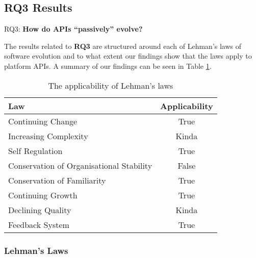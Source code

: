 \documentclass{sig-alternate}
\begin{document}
\subsection{RQ3 Results} \label{results_RQ3} 
\noindent
RQ3: \textbf{How do APIs ``passively'' evolve?}
\smallskip

The results related to \textbf{RQ3} are structured around each of Lehman's laws of software evolution \cite{lehman90sview} and to what extent our findings show that the laws apply to platform APIs. A summary of our findings can be seen in Table \ref{table:lehman}. 


\begin{table}
       \centering
       \begin{tabular}[ht]{l|c}
              \toprule

              \textbf{Law}                              & \textbf{Applicability}    \\ \midrule
              Continuing Change                         & True                      \\ \hline
              Increasing Complexity                     & Kinda                     \\ \hline
              Self Regulation                           & True                      \\ \hline
              Conservation of Organisational Stability  & False                     \\ \hline
              Conservation of Familiarity               & True                      \\ \hline
              Continuing Growth                         & True                      \\ \hline
              Declining Quality                         & Kinda                     \\ \hline
              Feedback System                           & True                      \\ 

              \bottomrule

       \end{tabular}
       \caption{The applicability of Lehman's laws}
       \label{table:lehman}
\end{table}


\subsubsection{Lehman's Laws}
\end{document}
